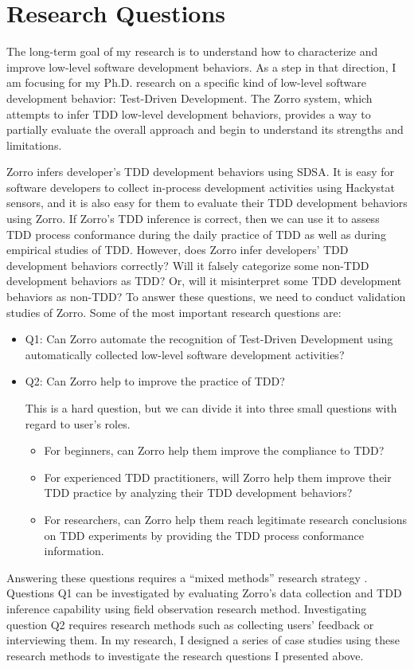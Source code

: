 \chapter{Research Questions}
\label{ch:researchquestions}
The long-term goal of my research is to understand how to characterize
and improve low-level software development behaviors.  As a step in
that direction, I am focusing for my Ph.D. research on a specific kind
of low-level software development behavior: Test-Driven
Development. The Zorro system, which attempts to infer TDD low-level
development behaviors, provides a way to partially evaluate the
overall approach and begin to understand its strengths and
limitations.

Zorro infers developer's TDD development behaviors using SDSA. It is
easy for software developers to collect in-process development
activities using Hackystat sensors, and it is also easy for them to
evaluate their TDD development behaviors using Zorro. If Zorro's TDD
inference is correct, then we can use it to assess TDD process
conformance during the daily practice of TDD as well as during empirical
studies of TDD. However, does Zorro infer developers' TDD development
behaviors correctly? Will it falsely categorize some non-TDD
development behaviors as TDD? Or, will it misinterpret some TDD
development behaviors as non-TDD? To answer these questions, we need 
to conduct validation studies of Zorro. Some of the most important research
questions are: 
\begin{itemize}
\item Q1: Can Zorro automate the recognition of Test-Driven Development
using automatically collected low-level software development activities?  
\item Q2: Can Zorro help to improve the practice of TDD? 

This is a hard question, but we can divide it into three small questions
with regard to user's roles.
   \begin{itemize}
   \item For beginners, can Zorro help them improve the compliance to TDD?
   \item For experienced TDD practitioners, will Zorro help them
   improve their TDD practice by analyzing their TDD development
   behaviors?
   \item For researchers, can Zorro help them reach legitimate
   research conclusions on TDD experiments by providing the TDD
   process conformance information.
   \end{itemize}
\end{itemize}

Answering these questions requires a ``mixed methods'' research strategy
\cite{Creswell:03}. Questions Q1 can be investigated by evaluating 
Zorro's data collection and TDD inference capability using field observation
research method. Investigating question Q2 requires research methods such  
as collecting users' feedback or interviewing them. In my research, 
I designed a series of case studies using these research methods to 
investigate the research questions I presented above.